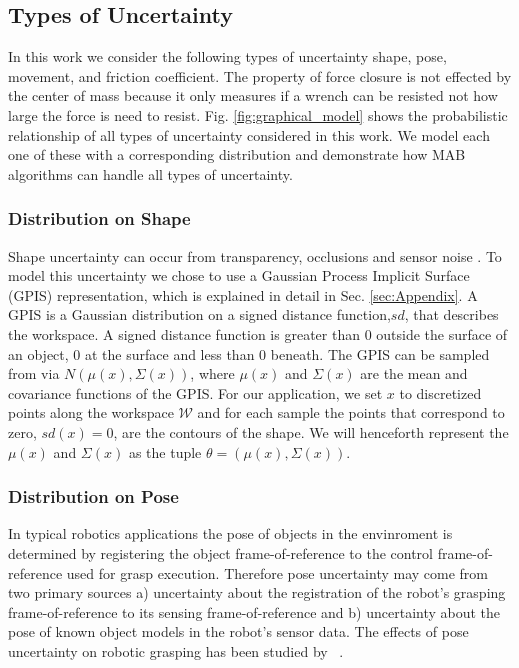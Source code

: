 \documentclass[journal,transmag]{IEEEtran}%
\begin{document}
\subsection{Types of Uncertainty}
In this work we consider the following types of uncertainty shape, pose, movement, and friction coefficient.  The property of force closure is not effected by the center of mass because it only measures if a wrench can be resisted not how large the force is need to resist.  Fig. \ref{fig:graphical_model} shows the probabilistic relationship of all types of uncertainty considered in this work. We model each one of these with a corresponding distribution and demonstrate how MAB algorithms can handle all types of uncertainty.

\subsubsection{Distribution on Shape}

Shape uncertainty can occur from transparency, occlusions and sensor noise \cite{mahler}. To model this uncertainty we chose to use a Gaussian Process Implicit Surface (GPIS) representation, which is explained in detail in Sec. \ref{sec:Appendix}.  A GPIS is a Gaussian distribution on a signed distance function,$sd$, that describes the workspace. A signed distance function is  greater than 0 outside the surface of an object, 0 at the surface and less than 0 beneath.  The GPIS can be sampled from via $N(\mu(x),\Sigma(x))$, where $\mu(x)$ and $\Sigma(x)$ are the mean and covariance functions of the GPIS. For our application, we set $x$ to discretized points along the workspace $\mathcal{W}$ and for each sample the points that correspond to zero, $sd(x) = 0$, are the contours of the shape. We will henceforth  represent the $\mu(x)$ and $\Sigma(x)$ as the tuple $\theta = \left( \mu(x), \Sigma(x) \right)$. 

\subsubsection{Distribution on Pose}
In typical robotics applications the pose of objects in the envinroment is determined by registering the object frame-of-reference to the control frame-of-reference used for grasp execution.
Therefore pose uncertainty may come from two primary sources a) uncertainty about the registration of the robot's grasping frame-of-reference to its sensing frame-of-reference and b) uncertainty about the pose of known object models in the robot's sensor data.
The effects of pose uncertainty on robotic grasping has been studied by ~\cite{}.
\end{document}
